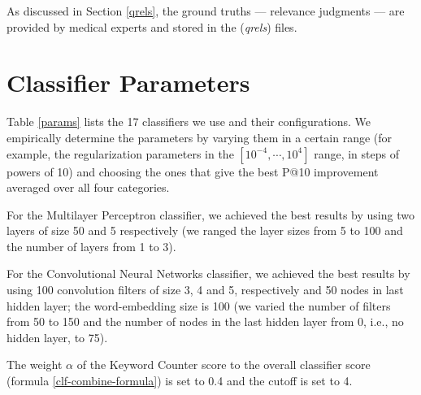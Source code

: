As discussed in Section \ref{qrels}, the ground truths --- relevance judgments --- are provided by medical experts
and stored in the (\emph{qrels}) files.

\section{Classifier Parameters}
Table \ref{params} lists the 17 classifiers we use and their configurations. 
We empirically determine
the 
parameters by varying them in a certain range (for example, the regularization parameters
in the $[10^{-4},\cdots,10^4]$ range, in steps of powers of 10) and choosing the ones
that give the
best P@10 improvement averaged over all four categories.

For the Multilayer Perceptron classifier, we achieved the best results by using two layers of size 50 and 5 respectively
(we ranged the layer sizes from 5 to 100 and the number of layers from 1 to 3).

For the Convolutional Neural Networks classifier, we achieved the best results by
using 100 convolution filters of size 3, 4 and 5, respectively and 50 nodes in last hidden layer; the word-embedding size is 100
(we varied the number of filters from 50 to 150 and the number of nodes in the last hidden layer from 0, i.e., no hidden layer, to 75).

The weight $\alpha$ of the Keyword Counter score to the overall classifier score (formula \ref{clf-combine-formula}) is set to 0.4 and
the \textsf{cutoff} is set to 4.

